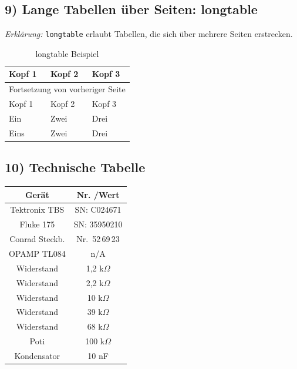 \documentclass[twoside]{scrreprt}
\begin{document}
\subsection*{9) Lange Tabellen über Seiten: longtable}
	\textit{Erklärung:} \texttt{longtable} erlaubt Tabellen, die sich über mehrere Seiten erstrecken.
\begin{longtable}{lll}
	\caption{longtable Beispiel} \\
	\toprule
	Kopf 1 & Kopf 2 & Kopf 3 \\
	\midrule
	\endfirsthead
	\multicolumn{3}{c}{Fortsetzung von vorheriger Seite} \\
	\toprule
	Kopf 1 & Kopf 2 & Kopf 3 \\
	\midrule
	\endhead
	Ein & Zwei & Drei \\
	Eins & Zwei & Drei \\
	\bottomrule
\end{longtable}

\subsection*{10) Technische Tabelle}
\begin{center}
\renewcommand{\arraystretch}{1}
\begin{tabular}{c|c}

\textbf{Gerät} & \textbf{Nr. /Wert} \\
\hline
Tektronix TBS      & SN: C024671 \\
Fluke 175          & SN: 35950210 \\
Conrad Steckb.     & Nr.\ 52\,69\,23 \\
OPAMP TL084        & n/A \\
Widerstand         & 1{,}2 k$\Omega$ \\
Widerstand         & 2{,}2 k$\Omega$ \\
Widerstand         & 10 k$\Omega$ \\
Widerstand         & 39 k$\Omega$ \\
Widerstand         & 68 k$\Omega$ \\
Poti               & 100 k$\Omega$ \\
Kondensator        & 10 nF \\

\end{tabular}
\end{center}


\newpage
\end{document}
